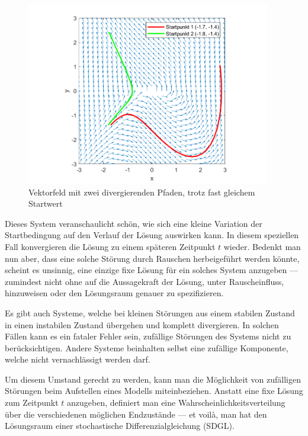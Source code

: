 \begin{figure}
	\centering
	\includegraphics[width=0.95\textwidth]{papers/brown/images/divergentDGL.png}
	\caption{Vektorfeld mit zwei divergierenden Pfaden, trotz fast gleichem Startwert}
	\label{brown:divergentAndConvergentSystem}
\end{figure}

Dieses System veranschaulicht schön, wie sich eine kleine Variation der Startbedingung auf den Verlauf der Lösung auswirken kann. In diesem speziellen Fall konvergieren die Lösung zu einem späteren Zeitpunkt $ t $ wieder. Bedenkt man nun aber, dass eine solche Störung durch Rauschen herbeigeführt werden könnte, scheint es unsinnig, eine einzige fixe Lösung für ein solches System anzugeben --- zumindest nicht ohne auf die Aussagekraft der Lösung, unter Rauscheinfluss, hinzuweisen oder den Lösungsraum genauer zu spezifizieren.

Es gibt auch Systeme, welche bei kleinen Störungen aus einem stabilen Zustand in einen instabilen Zustand übergehen und komplett divergieren. In solchen Fällen kann es ein fataler Fehler sein, zufällige Störungen des Systems nicht zu berücksichtigen. Andere Systeme beinhalten selbst eine zufällige Komponente, welche nicht vernachlässigt werden darf.

Um diesem Umstand gerecht zu werden, kann man die Möglichkeit von zufälligen Störungen beim Aufstellen eines Modells miteinbeziehen. Anstatt eine fixe Lösung zum Zeitpunkt $ t $ anzugeben, definiert man eine Wahrscheinlichkeitsverteilung über die verschiedenen möglichen Endzustände --- et voilà, man hat den Lösungsraum einer stochastische Differenzialgleichung (SDGL).
